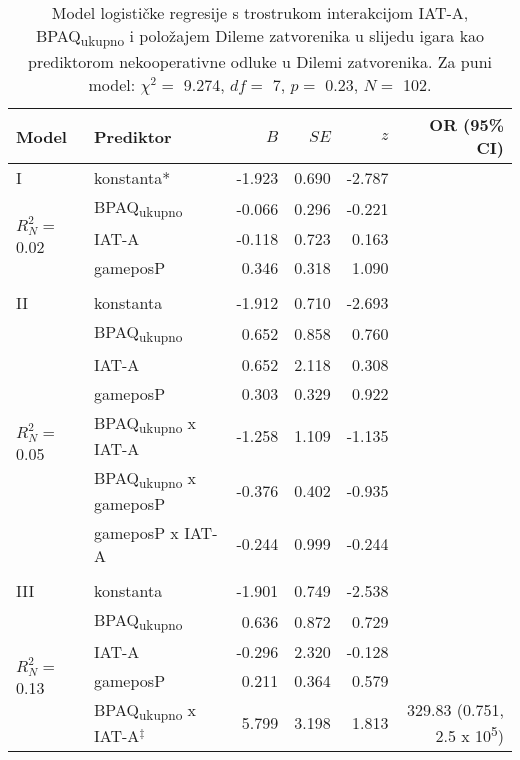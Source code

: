 \documentclass[a4paper, 12pt]{report}
\begin{document}
\begin{appendices}
\vspace*{\fill}
\begin{table}[h]
    \begin{center}
        \caption{\label{glmtotposP} Model logističke regresije s trostrukom interakcijom IAT-A,
            BPAQ\textsubscript{ukupno} i položajem Dileme zatvorenika u slijedu
            igara kao prediktorom
            nekooperativne odluke u Dilemi zatvorenika. 
            Za puni model: $\chi^2 =$ 9.274, $df =$ 7, $p =$ 0.23, $N
            =$ 102.}
        \hspace*{-0.7cm}\begin{tabular}{llrrrr}
        \toprule
        Model & Prediktor & $B$ & $SE$ & $z$ & OR (95\% CI)\\
        \midrule
        I & konstanta* & -1.923 & 0.690 & -2.787 &\\
        \multirow{3}{*}{$R^2_N =$ 0.02}
        &BPAQ\textsubscript{ukupno} & -0.066 & 0.296 & -0.221 &\\
        &IAT-A & -0.118 & 0.723 & 0.163 &\\
        &gameposP & 0.346 & 0.318 & 1.090  &\\
        &&&&&\\ 
        II & konstanta & -1.912 & 0.710 & -2.693 &\\
        \multirow{6}{*}{$R^2_N =$ 0.05}
        &BPAQ\textsubscript{ukupno} & 0.652 & 0.858 & 0.760 &\\
        &IAT-A & 0.652 & 2.118 & 0.308 &\\
        &gameposP & 0.303 & 0.329 & 0.922 &\\
        &BPAQ\textsubscript{ukupno} x IAT-A & -1.258 & 1.109 & -1.135 &\\
        &BPAQ\textsubscript{ukupno} x gameposP & -0.376 & 0.402 & -0.935 &\\
        &gameposP x IAT-A & -0.244 & 0.999 & -0.244 &\\
        &&&&&\\ 
        III & konstanta & -1.901 & 0.749 & -2.538 &\\
        \multirow{7}{*}{$R^2_N =$ 0.13}
        &BPAQ\textsubscript{ukupno} & 0.636 & 0.872 & 0.729 & \\
        &IAT-A & -0.296 & 2.320 & -0.128 &\\
        &gameposP & 0.211 & 0.364 & 0.579  &\\
        &BPAQ\textsubscript{ukupno} x IAT-A$^\ddagger$ & 5.799 & 3.198 & 1.813 &
        329.83 (0.751, 2.5 x 10\textsuperscript{5})\\

\end{tabular}
\end{center}
\end{table}
\end{appendices}
\end{document}
